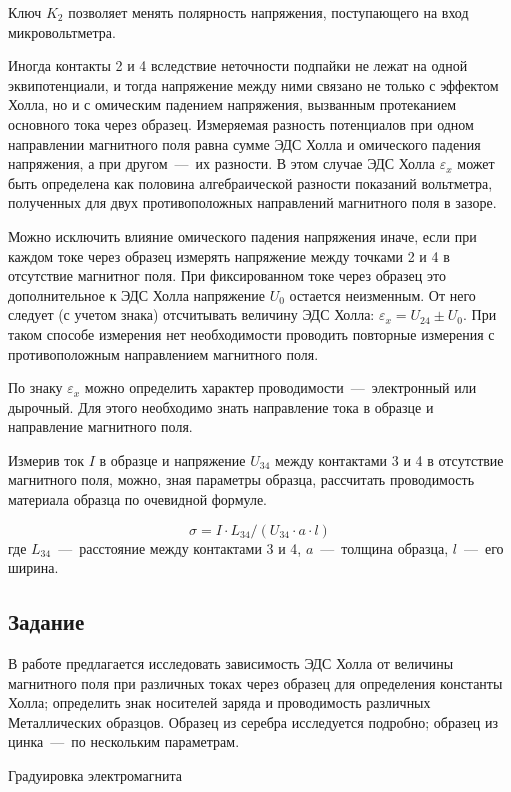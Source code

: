 \documentclass[a4paper, 12pt]{article}
\newcommand{\eps}{\varepsilon}
\newcommand{\mysec}[1]{\begin{center}\section*{#1}\end{center}}
\begin{document}
    Ключ $K_2$ позволяет менять полярность напряжения, поступающего на вход микровольтметра.

    Иногда контакты 2 и 4 вследствие неточности  подпайки не лежат на одной эквипотенциали, и тогда напряжение между ними связано не только с эффектом Холла, но и с омическим падением напряжения, вызванным протеканием основного тока через образец.
    Измеряемая разность потенциалов при одном направлении магнитного поля равна сумме ЭДС Холла и омического падения напряжения, а при другом~---~их разности. 
    В этом случае ЭДС Холла $\eps_x$ может быть определена как половина алгебраической разности показаний вольтметра, полученных для двух противоположных направлений магнитного поля в зазоре.

    Можно исключить влияние омического падения напряжения иначе, если при каждом токе через образец измерять напряжение между точками 2 и 4 в отсутствие магнитног поля. 
    При фиксированном токе через образец это дополнительное к ЭДС Холла напряжение $U_0$ остается неизменным. 
    От него следует (с учетом знака) отсчитывать величину ЭДС Холла: $\eps_x = U_24 \pm U_0$.
    При таком способе измерения нет необходимости проводить повторные измерения с противоположным направлением магнитного поля.

    По знаку $\eps_x$ можно определить характер проводимости~---~электронный или дырочный. Для этого необходимо знать направление тока в образце и направление магнитного поля.

    Измерив ток $I$ в образце и напряжение $U_{34}$ между контактами 3 и 4 в отсутствие магнитного поля, можно, зная параметры образца, рассчитать проводимость материала образца по очевидной формуле.

    \begin{equation}
        \sigma = I  \cdot L_{34} / \left( U_{34} \cdot a \cdot l \right)
    \end{equation}
    где $L_{34}$~---~расстояние между контактами 3 и 4, $a$~---~толщина образца, $l$~---~его ширина.

    \mysec{Задание}

    В работе предлагается исследовать зависимость ЭДС Холла от величины магнитного поля при различных токах через образец для определения константы Холла; определить знак носителей заряда и проводимость различных Металлических образцов.
    Образец из серебра исследуется подробно; образец из цинка~---~по нескольким параметрам.
    \\
    \begin{center}
        Градуировка электромагнита
    \end{center}
\end{document}
